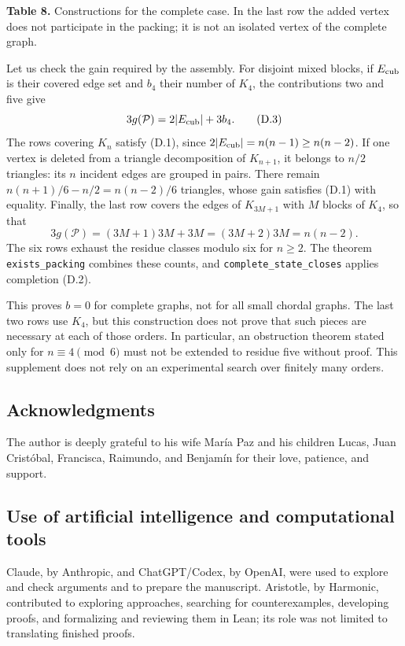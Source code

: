 \documentclass[english,11pt,a4paper]{article}
\begin{document}
\textbf{Table 8.} Constructions for the complete case. In the last row the added vertex does not participate in the packing; it is not an isolated vertex of the complete graph.

Let us check the gain required by the assembly. For disjoint mixed blocks, if \(E_{\rm cub}\) is their covered edge set and \(b_4\) their number of \(K_4\), the contributions two and five give \[
3g(\mathcal P)=2|E_{\rm cub}|+3b_4.
\tag{D.3}
\] The rows covering \(K_n\) satisfy (D.1), since \(2|E_{\rm cub}|=n(n-1)\ge n(n-2)\). If one vertex is deleted from a triangle decomposition of \(K_{n+1}\), it belongs to \(n/2\) triangles: its \(n\) incident edges are grouped in pairs. There remain \(n(n+1)/6-n/2=n(n-2)/6\) triangles, whose gain satisfies (D.1) with equality. Finally, the last row covers the edges of \(K_{3M+1}\) with \(M\) blocks of \(K_4\), so that \[
3g(\mathcal P)=(3M+1)3M+3M=(3M+2)3M=n(n-2).
\tag{D.4}
\] The six rows exhaust the residue classes modulo six for \(n\ge2\). The theorem \nolinkurl{exists_packing} combines these counts, and \nolinkurl{complete_state_closes} applies completion (D.2).

This proves \(b=0\) for complete graphs, not for all small chordal graphs. The last two rows use \(K_4\), but this construction does not prove that such pieces are necessary at each of those orders. In particular, an obstruction theorem stated only for \(n\equiv4\pmod6\) must not be extended to residue five without proof. This supplement does not rely on an experimental search over finitely many orders.

\subsection{Acknowledgments}\label{acknowledgments}

The author is deeply grateful to his wife María Paz and his children Lucas, Juan Cristóbal, Francisca, Raimundo, and Benjamín for their love, patience, and support.

\subsection{Use of artificial intelligence and computational tools}\label{use-of-artificial-intelligence-and-computational-tools}

Claude, by Anthropic, and ChatGPT/Codex, by OpenAI, were used to explore and check arguments and to prepare the manuscript. Aristotle, by Harmonic, contributed to exploring approaches, searching for counterexamples, developing proofs, and formalizing and reviewing them in Lean; its role was not limited to translating finished proofs.
\end{document}
